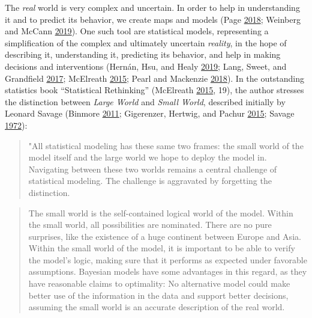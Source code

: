 \documentclass[
]{book}
\begin{document}
The \emph{real} world is very complex and uncertain. In order to help in understanding it and to predict its behavior, we create maps and models (Page \protect\hyperlink{ref-pageModelThinkerWhat2018}{2018}; Weinberg and McCann \protect\hyperlink{ref-weinbergSuperThinkingBig2019}{2019}). One such tool are statistical models, representing a simplification of the complex and ultimately uncertain \emph{reality}, in the hope of describing it, understanding it, predicting its behavior, and help in making decisions and interventions (Hernán, Hsu, and Healy \protect\hyperlink{ref-hernanSecondChanceGet2019}{2019}; Lang, Sweet, and Grandfield \protect\hyperlink{ref-langGettingNullStatistical2017}{2017}; McElreath \protect\hyperlink{ref-mcelreathStatisticalRethinkingBayesian2015}{2015}; Pearl and Mackenzie \protect\hyperlink{ref-pearlBookWhyNew2018}{2018}). In the outstanding statistics book ``Statistical Rethinking'' (McElreath \protect\hyperlink{ref-mcelreathStatisticalRethinkingBayesian2015}{2015}, 19), the author stresses the distinction between \emph{Large World} and \emph{Small World}, described initially by Leonard Savage (Binmore \protect\hyperlink{ref-binmoreRationalDecisions2011}{2011}; Gigerenzer, Hertwig, and Pachur \protect\hyperlink{ref-gigerenzerHeuristicsFoundationsAdaptive2015}{2015}; Savage \protect\hyperlink{ref-savageFoundationsStatistics1972}{1972}):

\begin{quote}
"All statistical modeling has these same two frames: the small world of the model itself and the large world we hope to deploy the model in. Navigating between these two worlds remains a central challenge of statistical modeling. The challenge is aggravated by forgetting the distinction.
\end{quote}

\begin{quote}
The small world is the self-contained logical world of the model. Within the small world, all possibilities are nominated. There are no pure surprises, like the existence of a huge continent between Europe and Asia. Within the small world of the model, it is important to be able to verify the model's logic, making sure that it performs as expected under favorable assumptions. Bayesian models have some advantages in this regard, as they have reasonable claims to optimality: No alternative model could make better use of the information in the data and support better decisions, assuming the small world is an accurate description of the real world.
\end{quote}
\end{document}
